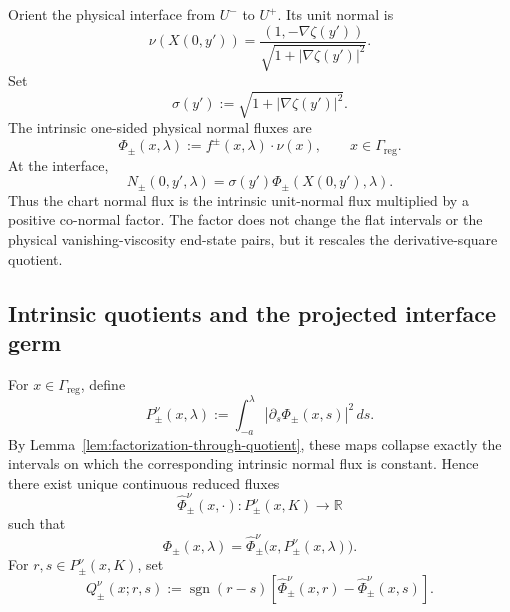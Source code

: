 \documentclass[11pt]{amsart}
\numberwithin{equation}{section}
\theoremstyle{plain}
\theoremstyle{definition}
\theoremstyle{remark}
\begin{document}
Orient the physical interface from \(U^-\) to \(U^+\). Its unit normal is
\begin{equation}
\label{eq:general-unit-normal}
    \nu(X(0,y'))
    =
    \frac{(1,-\nabla\zeta(y'))}
    {\sqrt{1+|\nabla\zeta(y')|^2}}.
\end{equation}
Set
\begin{equation}
\label{eq:general-sigma}
    \sigma(y')
    :=
    \sqrt{1+|\nabla\zeta(y')|^2}.
\end{equation}
The intrinsic one-sided physical normal fluxes are
\begin{equation}
\label{eq:general-intrinsic-normal-fluxes}
    \Phi_\pm(x,\lambda)
    :=
    f^\pm(x,\lambda)\cdot\nu(x),
    \qquad
    x\in\Gamma_{\mathrm{reg}}.
\end{equation}
At the interface,
\begin{equation}
\label{eq:general-chart-intrinsic-normal-relation}
    N_\pm(0,y',\lambda)
    =
    \sigma(y')
    \Phi_\pm(X(0,y'),\lambda).
\end{equation}
Thus the chart normal flux is the intrinsic unit-normal flux multiplied by a
positive co-normal factor. The factor does not change the flat intervals or
the physical vanishing-viscosity end-state pairs, but it rescales the
derivative-square quotient.

\subsection{Intrinsic quotients and the projected interface germ}
\label{subsec:general-intrinsic-quotient}

For \(x\in\Gamma_{\mathrm{reg}}\), define
\begin{equation}
\label{eq:general-intrinsic-boundary-quotients}
    P_\pm^\nu(x,\lambda)
    :=
    \int_{-a}^{\lambda}
        \left|
            \partial_s\Phi_\pm(x,s)
        \right|^2
    \,ds.
\end{equation}
By Lemma~\ref{lem:factorization-through-quotient}, these maps collapse
exactly the intervals on which the corresponding intrinsic normal flux is
constant. Hence there exist unique continuous reduced fluxes
\[
    \widehat\Phi_\pm^\nu(x,\cdot):
    P_\pm^\nu(x,K)\longrightarrow\mathbb R
\]
such that
\begin{equation}
\label{eq:general-intrinsic-reduced-flux}
    \Phi_\pm(x,\lambda)
    =
    \widehat\Phi_\pm^\nu
    \bigl(x,P_\pm^\nu(x,\lambda)\bigr).
\end{equation}
For \(r,s\in P_\pm^\nu(x,K)\), set
\begin{equation}
\label{eq:general-intrinsic-entropy-flux}
    Q_\pm^\nu(x;r,s)
    :=
    \operatorname{sgn}(r-s)
    \left[
        \widehat\Phi_\pm^\nu(x,r)
        -
        \widehat\Phi_\pm^\nu(x,s)
    \right].
\end{equation}
\end{document}

